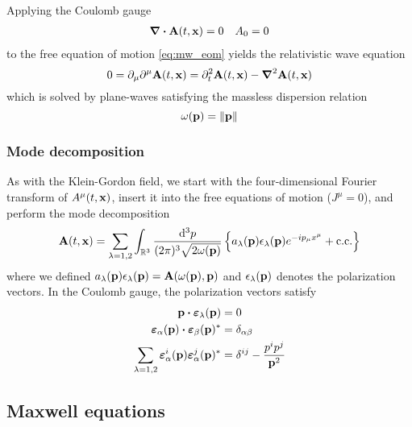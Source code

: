 Applying the Coulomb gauge
\begin{align}
	\div\vb{A}(t,\vb{x})
	=
	0
	&&
	A_0
	=
	0
	\label{eq:mw_coulomb_gauge}
\end{align}
to the free equation of motion \cref{eq:mw_eom} yields the relativistic wave equation
\begin{equation}
	0
	=
	\partial_\mu\partial^\mu
	\vb{A}(t,\vb{x})
	=
	\partial_t^2
	\vb{A}(t,\vb{x})
	-
	\grad^2
	\vb{A}(t,\vb{x})
	\label{eq:mw_relatistic_wave}
\end{equation}
which is solved by plane-waves satisfying the massless dispersion relation
\begin{equation}
	\omega(\vb{p})
	=
	\norm{\vb{p}}
\end{equation}

\subsubsection{Mode decomposition}

As with the Klein-Gordon field, we start with the four-dimensional Fourier transform of $A^\mu(t,\vb{x})$, insert it into the free equations of motion ($J^\mu=0$), and perform the mode decomposition
\begin{equation}
	\vb{A}(t,\vb{x})
	=
	\sum_{\lambda=1,2}
	\int_{\mathbb{R}^3}\frac{\dd[3]{p}}{(2\pi)^3\sqrt{2\omega(\vb{p})}}
	\left\{
		a_\lambda(\vb{p})
		\vb{\epsilon}_\lambda(\vb{p})
		e^{-ip_\mu x^\mu}
		+
		\text{c.c.}
	\right\}
	\label{eq:mw_ft}
\end{equation}
where we defined $a_\lambda(\vb{p})\vb{\epsilon}_\lambda(\vb{p})=\vb{A}(\omega(\vb{p}),\vb{p})$ and $\vb{\epsilon}_\lambda(\vb{p})$ denotes the polarization vectors.
In the Coulomb gauge, the polarization vectors satisfy~\cite[p.~341]{Srednicki2007}
\begin{align}
	\vb{p}
	\vdot
	\boldsymbol{\varepsilon}_\lambda(\vb{p})
	&=
	0
	\\
	\boldsymbol{\varepsilon}_\alpha(\vb{p})
	\vdot
	\boldsymbol{\varepsilon}_\beta(\vb{p})^*
	&=
	\delta_{\alpha\beta}
	\\
	\sum_{\lambda=1,2}
	\boldsymbol{\varepsilon}_\alpha^i(\vb{p})
	\boldsymbol{\varepsilon}_\alpha^j(\vb{p})^*
	&=
	\delta^{ij}
	-
	\frac{p^ip^j}{\vb{p}^2}
\end{align}

\subsection{Maxwell equations}

